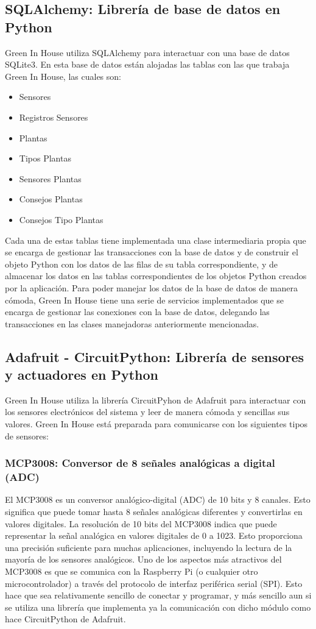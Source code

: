     \subsection{SQLAlchemy: Librería de base de datos en Python}
    Green In House utiliza SQLAlchemy \cite{wiki:sqlalchemy} para interactuar con una base de datos SQLite3. En esta base de datos están alojadas las tablas con las que trabaja Green In House, las cuales son:
    \begin{itemize}
        \item Sensores
        \item Registros Sensores
        \item Plantas
        \item Tipos Plantas
        \item Sensores Plantas
        \item Consejos Plantas
        \item Consejos Tipo Plantas
    \end{itemize}
    Cada una de estas tablas tiene implementada una clase intermediaria propia que se encarga de gestionar las transacciones con la base de datos y de construir el objeto Python con los datos de las filas de su tabla correspondiente, y de almacenar los datos en las tablas correspondientes de los objetos Python creados por la aplicación. 
    Para poder manejar los datos de la base de datos de manera cómoda, Green In House tiene una serie de servicios implementados que se encarga de gestionar las conexiones con la base de datos, delegando las transacciones en las clases manejadoras anteriormente mencionadas.

    \subsection{Adafruit - CircuitPython: Librería de sensores y actuadores en Python}
    Green In House utiliza la librería CircuitPyhon de Adafruit \cite{wiki:adafruit_circuit_Python} para interactuar con los sensores electrónicos del sistema y leer de manera cómoda y sencillas sus valores. Green In House está preparada para comunicarse con los siguientes tipos de sensores:
       \subsubsection{MCP3008: Conversor de 8 señales analógicas a digital (ADC)}
        El MCP3008 \cite{wiki:mcp3008} es un conversor analógico-digital (ADC) de 10 bits y 8 canales. Esto significa que puede tomar hasta 8 señales analógicas diferentes y convertirlas en valores digitales.
        La resolución de 10 bits del MCP3008 indica que puede representar la señal analógica en valores digitales de 0 a 1023. Esto proporciona una precisión suficiente para muchas aplicaciones, incluyendo la lectura de la mayoría de los sensores analógicos.
        Uno de los aspectos más atractivos del MCP3008 es que se comunica con la Raspberry Pi (o cualquier otro microcontrolador) a través del protocolo de interfaz periférica serial (SPI). Esto hace que sea relativamente sencillo de conectar y programar, y más sencillo aun si se utiliza una librería que implementa ya la comunicación con dicho módulo como hace CircuitPython de Adafruit. \cite{doc:mcp3008}
        
